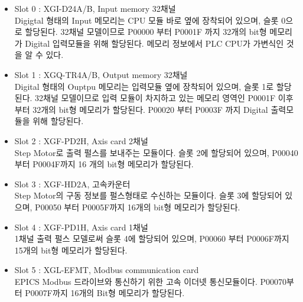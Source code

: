 \documentclass[11pt
  , a4paper
  , article
  , oneside
]{memoir}
\begin{document}
\begin{itemize}
\item Slot 0 : XGI-D24A/B, Input memory 32채널\\
Digigtal 형태의 Input 메모리는 CPU 모듈 바로 옆에 장착되어 있으며, 슬롯 0으로 할당된다. 32채널 모델이므로 P00000 부터 P0001F 까지 32개의 bit형 메모리가 Digital 입력모듈을 위해 할당된다. 메모리 정보에서 PLC CPU가 가변식인 것을 알 수 있다.   
\end{itemize}

\begin{itemize}
\item Slot 1 : XGQ-TR4A/B, Output memory 32채널\\
Digital 형태의 Ouptpu 메모리는 입력모듈 옆에 장착되어 있으며, 슬롯 1로 할당된다. 32채널 모델이므로 입력 모듈이 차지하고 있는 메모리 영역인 P0001F 이후 부터 32개의 bit형 메모리가 할당된다. P00020 부터 P0003F 까지 Digital 출력모듈을 위해 할당된다.  
\end{itemize}

\begin{itemize}
\item Slot 2 : XGF-PD2H, Axis card 2채널\\
Step Motor로 출력 펄스를 보내주는 모듈이다. 슬롯 2에 할당되어 있으며, P00040 부터 P0004F까지 16 개의 bit형 메모리가 할당된다.
\end{itemize}

\begin{itemize}
\item Slot 3 : XGF-HD2A, 고속카운터\\
Step Motor의 구동 정보를 펄스형태로 수신하는 모듈이다. 슬롯 3에 할당되어 있으며, P00050 부터 P0005F까지 16개의 bit형 메모리가 할당된다.
\end{itemize}

\begin{itemize}
\item Slot 4 : XGF-PD1H, Axis card 1채널\\
1채널 출력 펄스 모델로써 슬롯 4에 할당되어 있으며, P00060 부터 P0006F까지 15개의 bit형 메모리가 할당된다.
\end{itemize}

\begin{itemize}
\item Slot 5 : XGL-EFMT, Modbus communication card\\
EPICS Modbus 드라이브와 통신하기 위한 고속 이더넷 통신모듈이다. P00070부터 P0007F까지 16개의 Bit형 메모리가 할당된다.	
\end{itemize}
\end{document}
